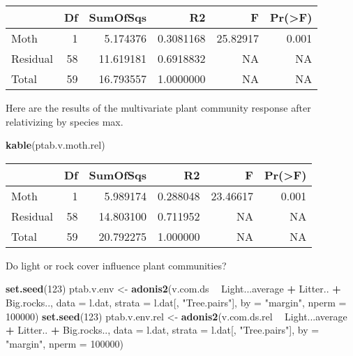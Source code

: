 \documentclass[]{article}
\newenvironment{Shaded}{\begin{snugshade}}{\end{snugshade}}
\newcommand{\KeywordTok}[1]{\textcolor[rgb]{0.13,0.29,0.53}{\textbf{#1}}}
\newcommand{\DataTypeTok}[1]{\textcolor[rgb]{0.13,0.29,0.53}{#1}}
\newcommand{\DecValTok}[1]{\textcolor[rgb]{0.00,0.00,0.81}{#1}}
\newcommand{\StringTok}[1]{\textcolor[rgb]{0.31,0.60,0.02}{#1}}
\newcommand{\OperatorTok}[1]{\textcolor[rgb]{0.81,0.36,0.00}{\textbf{#1}}}
\newcommand{\NormalTok}[1]{#1}
\begin{document}
\begin{longtable}[]{@{}lrrrrr@{}}
\toprule
& Df & SumOfSqs & R2 & F & Pr(\textgreater{}F)\tabularnewline
\midrule
\endhead
Moth & 1 & 5.174376 & 0.3081168 & 25.82917 & 0.001\tabularnewline
Residual & 58 & 11.619181 & 0.6918832 & NA & NA\tabularnewline
Total & 59 & 16.793557 & 1.0000000 & NA & NA\tabularnewline
\bottomrule
\end{longtable}

Here are the results of the multivariate plant community response after
relativizing by species max.

\begin{Shaded}
\begin{Highlighting}[]
\KeywordTok{kable}\NormalTok{(ptab.v.moth.rel)}
\end{Highlighting}
\end{Shaded}

\begin{longtable}[]{@{}lrrrrr@{}}
\toprule
& Df & SumOfSqs & R2 & F & Pr(\textgreater{}F)\tabularnewline
\midrule
\endhead
Moth & 1 & 5.989174 & 0.288048 & 23.46617 & 0.001\tabularnewline
Residual & 58 & 14.803100 & 0.711952 & NA & NA\tabularnewline
Total & 59 & 20.792275 & 1.000000 & NA & NA\tabularnewline
\bottomrule
\end{longtable}

Do light or rock cover influence plant communities?

\begin{Shaded}
\begin{Highlighting}[]
\KeywordTok{set.seed}\NormalTok{(}\DecValTok{123}\NormalTok{)}
\NormalTok{ptab.v.env <-}\StringTok{ }\KeywordTok{adonis2}\NormalTok{(v.com.ds }\OperatorTok{~}\StringTok{ }\NormalTok{Light...average }\OperatorTok{+}\StringTok{ }\NormalTok{Litter.. }\OperatorTok{+}\StringTok{ }\NormalTok{Big.rocks..,}
                      \DataTypeTok{data =}\NormalTok{ l.dat, }
                      \DataTypeTok{strata =}\NormalTok{ l.dat[, }\StringTok{"Tree.pairs"}\NormalTok{], }
                      \DataTypeTok{by =} \StringTok{"margin"}\NormalTok{, }\DataTypeTok{nperm =} \DecValTok{100000}\NormalTok{)}
\KeywordTok{set.seed}\NormalTok{(}\DecValTok{123}\NormalTok{)}
\NormalTok{ptab.v.env.rel <-}\StringTok{ }\KeywordTok{adonis2}\NormalTok{(v.com.ds.rel }\OperatorTok{~}\StringTok{ }\NormalTok{Light...average }\OperatorTok{+}\StringTok{ }\NormalTok{Litter.. }\OperatorTok{+}\StringTok{ }\NormalTok{Big.rocks..,}
                          \DataTypeTok{data =}\NormalTok{ l.dat, }
                          \DataTypeTok{strata =}\NormalTok{ l.dat[, }\StringTok{"Tree.pairs"}\NormalTok{], }
                          \DataTypeTok{by =} \StringTok{"margin"}\NormalTok{, }\DataTypeTok{nperm =} \DecValTok{100000}\NormalTok{)}
\end{Highlighting}
\end{Shaded}
\end{document}
